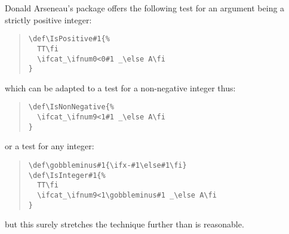 Donald Arseneau's  package offers the following test
for an argument being a strictly positive integer:
\begin{quote}
\begin{verbatim}
\def\IsPositive#1{%
  TT\fi
  \ifcat_\ifnum0<0#1 _\else A\fi
}
\end{verbatim}
\end{quote}
which can be adapted to a test for a non-negative integer thus:
\begin{quote}
\begin{verbatim}
\def\IsNonNegative{%
  \ifcat_\ifnum9<1#1 _\else A\fi
}
\end{verbatim}
\end{quote}
or a test for any integer:
\begin{quote}
\begin{verbatim}
\def\gobbleminus#1{\ifx-#1\else#1\fi}
\def\IsInteger#1{%
  TT\fi
  \ifcat_\ifnum9<1\gobbleminus#1 _\else A\fi
}
\end{verbatim}
\end{quote}
but this surely stretches the technique further than is reasonable.

